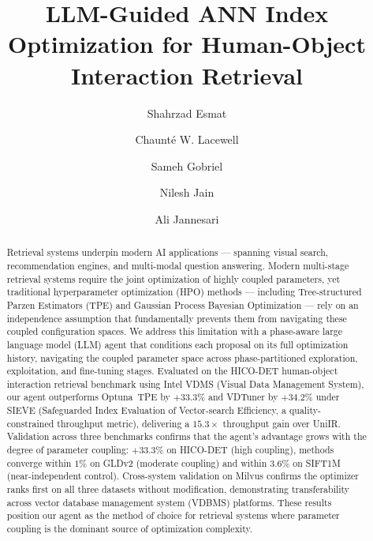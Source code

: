 \documentclass[sigconf, nonacm]{acmart}
\theoremstyle{definition}
\begin{document}
\title{LLM-Guided ANN Index Optimization for Human-Object Interaction Retrieval}

\author{Shahrzad Esmat}

\author{Chaunté W. Lacewell}

\author{Sameh Gobriel}

\author{Nilesh Jain}

\author{Ali Jannesari}

\begin{abstract}
Retrieval systems underpin modern AI applications --- spanning visual search,
recommendation engines, and multi-modal question answering.
Modern multi-stage retrieval systems require the joint optimization of highly coupled
parameters, yet traditional hyperparameter optimization (HPO) methods ---
including Tree-structured Parzen Estimators (TPE) and Gaussian Process Bayesian Optimization ---
rely on an independence assumption that fundamentally prevents them from
navigating these coupled configuration spaces.
We address this limitation with a phase-aware large language model (LLM) agent
that conditions each proposal on its full optimization history, navigating the
coupled parameter space across phase-partitioned exploration, exploitation, and
fine-tuning stages.
Evaluated on the HICO-DET human-object interaction retrieval benchmark using
Intel VDMS (Visual Data Management System), our agent outperforms Optuna~TPE
by $+33.3\%$ and VDTuner by $+34.2\%$ under SIEVE (Safeguarded Index Evaluation of Vector-search Efficiency, a quality-constrained
throughput metric), delivering a $15.3\times$ throughput gain over UniIR.
Validation across three benchmarks confirms that the agent's advantage grows with
the degree of parameter coupling: $+33.3\%$ on HICO-DET (high coupling),
methods converge within $1\%$ on GLDv2 (moderate coupling) and within $3.6\%$
on SIFT1M (near-independent control).
Cross-system validation on Milvus confirms the optimizer ranks first on all three
datasets without modification, demonstrating transferability across vector database
management system (VDBMS) platforms.
These results position our agent as the method of choice for retrieval systems
where parameter coupling is the dominant source of optimization complexity.
\end{abstract}
\end{document}
